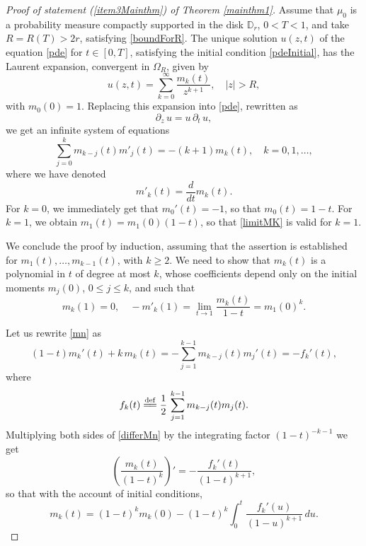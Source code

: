 \documentclass[reqno,11pt]{amsart}
\theoremstyle{plain}
\theoremstyle{definition}
\theoremstyle{remark}
\numberwithin{equation}{section}
\numberwithin{equation}{section}
\newcommand{\D}{\mathbb{D}}
\newcommand{\isdef}{\overset{\mathrm{def}}{=\joinrel=}}
\begin{document}
\begin{proof}[Proof of statement \textit{(\ref{item3Mainthm})} of Theorem \ref{mainthm1}]
Assume that $\mu_0$ is a probability measure compactly supported in the disk $\D_r$, $0<T<1$, and take $R=R(T)>2r$, satisfying \eqref{boundForR}. The unique solution $u(z,t)$ of the equation \eqref{pde} for $t\in [0,T]$, satisfying the initial condition \eqref{pdeInitial}, has the Laurent expansion, convergent in $\Omega_R$, given by
	\begin{equation} \label{expansionatInfinity}
		u(z,t) = \sum_{k=0}^\infty \frac{m_k(t)}{z^{k+1}}, \quad |z|>R,
	\end{equation}
	with $m_0(0)=1$. 
	Replacing this expansion into \eqref{pde}, rewritten as
	\begin{equation} \label{pdeRewritten}
		\partial_z\, u =u\, \partial_t\,  u,
	\end{equation}
	we get  an infinite system of equations
	\begin{equation} \label{mn}
		\sum_{j=0}^{k} m_{k-j}(t) m'_j(t) =-(k+1) m_k(t), \quad k=0, 1, \dots,
	\end{equation}
	where we have denoted
	$$
	m'_k(t) = \frac{d}{d t}m_k(t) .
	$$
	For $k=0$, we immediately get that $m_0'(t)=-1$, so that $m_0(t)= 1-t$. For $k=1$, we obtain $m_1(t)=m_1(0)(1-t)$, so that \eqref{limitMK} is valid for $k=1$.
	
	We conclude the proof by induction, assuming that the assertion is established for $m_1(t), \dots, m_{k-1}(t)$, with $k\ge 2$. We need to show that $m_k(t)$ is a polynomial in $t$ of degree at most $k$, whose coefficients depend only on the initial moments $m_j(0)$, $0\leq j \le k$, and such that
 $$  
 m_k(1)=0, \quad -m'_k(1)=\lim_{t\to 1} \frac{m_k(t)}{1-t}= m_1(0)^k.
$$
 
Let us rewrite \eqref{mn} as
	\begin{equation} \label{differMn}
		(1-t) m_k'(t) +k \, m_k(t) =-  \sum_{j=1}^{k-1} m_{k-j}(t)  m_j'(t)=-f_k'(t),
	\end{equation}
where
	$$
	f_k(t)\isdef   \frac{1}{2}\, \sum_{j=1}^{k-1} m_{k-j}(t)  m_j(t).
	$$
 Multiplying both sides of \eqref{differMn} by the integrating factor $(1-t)^{-k-1}$ we get
	$$
	\left(  \frac{m_k(t)}{(1-t)^{k}} \right)' =-  \frac{f_k'(t)}{ (1-t)^{k+1}} , 
	$$
	so that with the account of initial conditions, 
	\begin{equation} \label{eq:mkinterm}
		m_k(t) = (1-t)^{k}m_k(0) - (1-t)^{k} \int_0^t \frac{f_k'(u)}{ (1-u)^{k+1}} \, du.
	\end{equation}


\end{proof}
\end{document}
